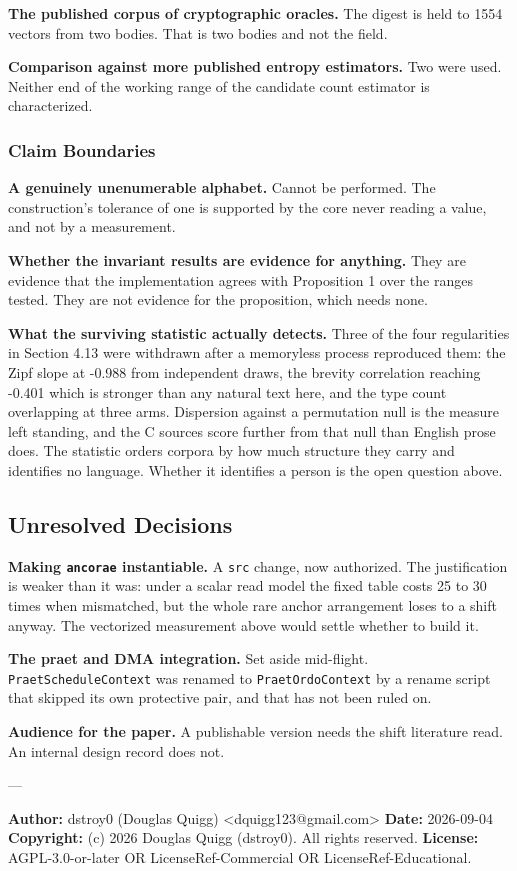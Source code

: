 \textbf{The published corpus of cryptographic oracles.} The digest is held to 1554 vectors from two bodies. That is two bodies and not the field.

\textbf{Comparison against more published entropy estimators.} Two were used. Neither end of the working range of the candidate count estimator is characterized.

\subsubsection{Claim Boundaries}

\textbf{A genuinely unenumerable alphabet.} Cannot be performed. The construction's tolerance of one is supported by the core never reading a value, and not by a measurement.

\textbf{Whether the invariant results are evidence for anything.} They are evidence that the implementation agrees with Proposition 1 over the ranges tested. They are not evidence for the proposition, which needs none.

\textbf{What the surviving statistic actually detects.} Three of the four regularities in Section 4.13 were withdrawn after a memoryless process reproduced them: the Zipf slope at -0.988 from independent draws, the brevity correlation reaching -0.401 which is stronger than any natural text here, and the type count overlapping at three arms. Dispersion against a permutation null is the measure left standing, and the C sources score further from that null than English prose does. The statistic orders corpora by how much structure they carry and identifies no language. Whether it identifies a person is the open question above.

\subsection{Unresolved Decisions}

\textbf{Making \texttt{ancorae} instantiable.} A \texttt{src} change, now authorized. The justification is weaker than it was: under a scalar read model the fixed table costs 25 to 30 times when mismatched, but the whole rare anchor arrangement loses to a shift anyway. The vectorized measurement above would settle whether to build it.

\textbf{The praet and DMA integration.} Set aside mid-flight. \texttt{Praet\allowbreak{}Schedule\allowbreak{}Context} was renamed to \texttt{Praet\allowbreak{}Ordo\allowbreak{}Context} by a rename script that skipped its own protective pair, and that has not been ruled on.

\textbf{Audience for the paper.} A publishable version needs the shift literature read. An internal design record does not.

---

\textbf{Author:} dstroy0 (Douglas Quigg) <dquigg123@gmail.com> \textbf{Date:} 2026-09-04 \textbf{Copyright:} (c) 2026 Douglas Quigg (dstroy0). All rights reserved. \textbf{License:} AGPL-3.0-or-later OR LicenseRef-Commercial OR LicenseRef-Educational.

